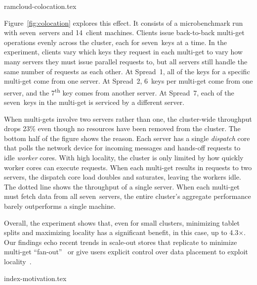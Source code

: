  {ramcloud-colocation.tex}

Figure~\ref{fig:colocation} explores this effect. It consists of a
microbenchmark run with seven~servers and 14~client machines. Clients issue back-to-back
multi-get operations evenly across the cluster, each for seven~keys at a time. In
the experiment, clients vary which keys they request in each multi-get to vary
how many servers they must issue parallel requests to, but all servers still
handle the same number of requests as each other.
At Spread~1, all of the keys for a specific multi-get come from one server. At
Spread~2, 6~keys per multi-get come from one server, and the
7\textsuperscript{th} key comes from another server. At Spread~7, each of the
seven~keys in the multi-get is serviced by a different server.

When multi-gets involve two servers rather than one, the cluster-wide throughput
drops 23\% even though no resources have been removed from the cluster. The
bottom half of the figure shows the reason.  Each server has a single {\em dispatch}
core that polls the network device for incoming messages and hands-off requests
to idle {\em worker} cores.  With high locality, the cluster is only limited by
how quickly worker cores can execute requests. When each multi-get results in
requests to two servers, the dispatch core load doubles and saturates, leaving
the workers idle. The dotted line shows the throughput of a single server.
When each multi-get must fetch data from all seven~servers, the entire
cluster's aggregate performance barely outperforms a single machine.

Overall, the experiment shows that, even for small clusters, minimizing tablet
splits and maximizing locality has a significant benefit, in this case, up to
4.3$\times$.  Our findings echo recent trends in scale-out stores that
replicate to minimize multi-get ``fan-out''~\cite{fb-memcache} or give users
explicit control over data placement to exploit locality~\cite{spanner}.

 {index-motivation.tex}

